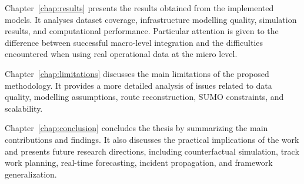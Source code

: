 Chapter~\ref{chap:results} presents the results obtained from the implemented models. It analyses dataset coverage, 
infrastructure modelling quality, simulation results, and computational performance. Particular attention is given to the 
difference between successful macro-level integration and the difficulties encountered when using real operational data at 
the micro level.

Chapter~\ref{chap:limitations} discusses the main limitations of the proposed methodology. It provides a more detailed 
analysis of issues related to data quality, modelling assumptions, route reconstruction, SUMO constraints, and scalability.

Chapter~\ref{chap:conclusion} concludes the thesis by summarizing the main contributions and findings. It also discusses 
the practical implications of the work and presents future research directions, including counterfactual simulation, track 
work planning, real-time forecasting, incident propagation, and framework generalization.